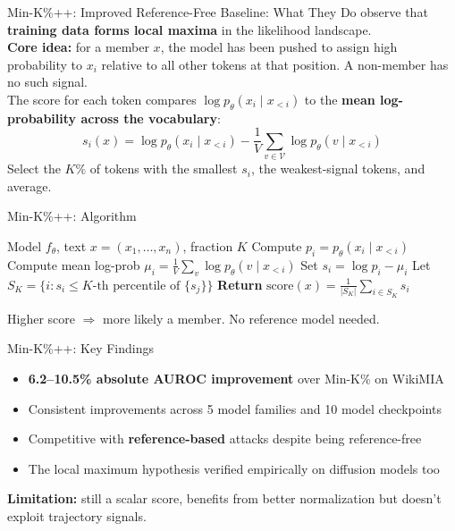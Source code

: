 \documentclass[10pt, aspectratio=169]{beamer}
\begin{document}

\begin{frame}{Min-K\%++: Improved Reference-Free Baseline: What They Do}
  \citet{zhang2024mink} observe that \textbf{training data forms local maxima} in the likelihood landscape.\\[8pt]
  \textbf{Core idea:} for a member $x$, the model has been pushed to assign high probability to $x_i$
  relative to all other tokens at that position.
  A non-member has no such signal.\\[8pt]
  The score for each token compares $\log p_\theta(x_i \mid x_{<i})$ to
  the \textbf{mean log-probability across the vocabulary}:
  \[
    s_i(x) = \log p_\theta(x_i\mid x_{<i}) - \frac{1}{V}\sum_{v\in\mathcal{V}}\log p_\theta(v\mid x_{<i})
  \]
  Select the $K\%$ of tokens with the smallest $s_i$, the weakest-signal tokens, and average.
\end{frame}

\begin{frame}{Min-K\%++: Algorithm}
  \begin{algorithmic}[1]
    \Require Model $f_\theta$, text $x = (x_1, \ldots, x_n)$, fraction $K$
      \State Compute $p_i = p_\theta(x_i \mid x_{<i})$
      \State Compute mean log-prob $\mu_i = \frac{1}{V}\sum_v \log p_\theta(v \mid x_{<i})$
      \State Set $s_i = \log p_i - \mu_i$
    \EndFor
    \State Let $S_{K} = \{i : s_i \leq \text{$K$-th percentile of } \{s_j\}\}$
    \State \textbf{Return} $\mathrm{score}(x) = \frac{1}{|S_K|}\sum_{i \in S_K} s_i$
  \end{algorithmic}
  \vspace{6pt}
  Higher score $\Rightarrow$ more likely a member. No reference model needed.
\end{frame}

\begin{frame}{Min-K\%++: Key Findings}
  \begin{itemize}
    \item \textbf{6.2–10.5\% absolute AUROC improvement} over Min-K\% on WikiMIA
    \item Consistent improvements across 5 model families and 10 model checkpoints
    \item Competitive with \textbf{reference-based} attacks despite being reference-free
    \item The local maximum hypothesis verified empirically on diffusion models too
  \end{itemize}
  \vspace{8pt}
  \textbf{Limitation:} still a scalar score, benefits from better normalization but doesn't exploit trajectory signals.
\end{frame}
\end{document}
